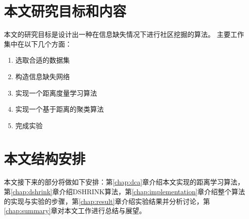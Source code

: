 \section{本文研究目标和内容}

本文的研究目标是设计出一种在信息缺失情况下进行社区挖掘的算法。
主要工作集中在以下几个方面：

\begin{enumerate}
\item 选取合适的数据集
\item 构造信息缺失网络
\item 实现一个距离度量学习算法
\item 实现一个基于距离的聚类算法
\item 完成实验
\end{enumerate}

\section{本文结构安排}

本文接下来的部分将做如下安排：第\ref{chap:dca}章介绍本文实现的距离学习算法，第\ref{chap:dshrink}章介绍DSHRINK算法，第\ref{chap:implementation}章介绍整个算法的实现与实验的步骤，第\ref{chap:result}章介绍实验结果并分析讨论，第\ref{chap:summary}章对本文工作进行总结与展望。
